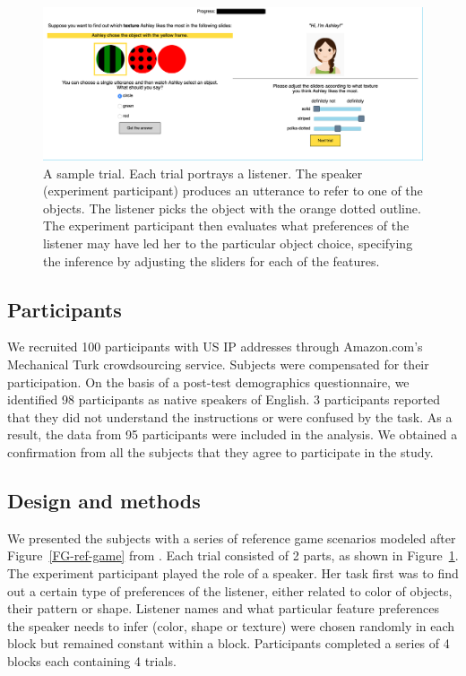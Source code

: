\documentclass[10pt,a4paper]{article}
\begin{document}
\begin{figure}[ht!]
	\centering
	\includegraphics[width=5.5in]{images/utterance_choice_modification_4.png}
	\caption{ \small{A sample trial.  Each trial portrays a listener. The speaker (experiment participant) produces an utterance to refer to one of the objects. The listener picks the object with the orange dotted outline. The experiment participant then evaluates what preferences of the listener may have led her to the particular object choice, specifying the inference by adjusting the sliders for each of the features}.}
	\label{exp1-trial}
\end{figure}

\subsection{Participants}

We recruited 100 participants with US IP addresses through Amazon.com's Mechanical Turk crowdsourcing service. Subjects were compensated for their participation. On the basis of a post-test demographics questionnaire, we identified 98 participants as native speakers of English. 3 participants reported that they did not understand the instructions or were confused by the task. As a result, the data from 95 participants were included in the analysis. We obtained a confirmation from all the subjects that they agree to participate in the study.

\subsection{Design and methods}

We presented the subjects with a series of reference game scenarios modeled after Figure~\ref{FG-ref-game} from .
Each trial consisted of 2 parts, as shown in Figure~\ref{exp1-trial}. The experiment participant played the role of a speaker. Her task first was to find out a certain type of preferences of the listener, either related to color of objects, their pattern or shape. Listener names and what particular feature preferences the speaker needs to infer (color, shape or texture) were chosen randomly in each block but remained constant within a block. Participants completed a series of 4 blocks each containing 4 trials. 
\end{document}
